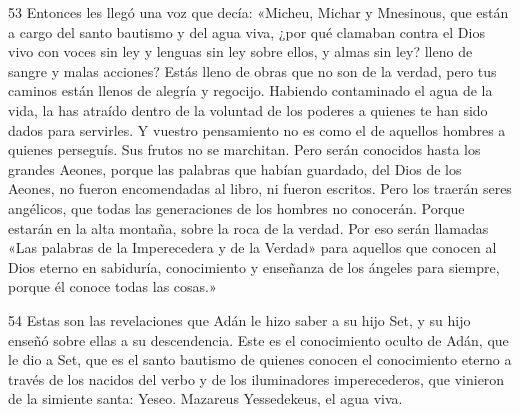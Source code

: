 \par 53 Entonces les llegó una voz que decía: «Micheu, Michar y Mnesinous, que están a cargo del santo bautismo y del agua viva, ¿por qué clamaban contra el Dios vivo con voces sin ley y lenguas sin ley sobre ellos, y almas sin ley? lleno de sangre y malas acciones? Estás lleno de obras que no son de la verdad, pero tus caminos están llenos de alegría y regocijo. Habiendo contaminado el agua de la vida, la has atraído dentro de la voluntad de los poderes a quienes te han sido dados para servirles. Y vuestro pensamiento no es como el de aquellos hombres a quienes perseguís. Sus frutos no se marchitan. Pero serán conocidos hasta los grandes Aeones, porque las palabras que habían guardado, del Dios de los Aeones, no fueron encomendadas al libro, ni fueron escritos. Pero los traerán seres angélicos, que todas las generaciones de los hombres no conocerán. Porque estarán en la alta montaña, sobre la roca de la verdad. Por eso serán llamadas «Las palabras de la Imperecedera y de la Verdad» para aquellos que conocen al Dios eterno en sabiduría, conocimiento y enseñanza de los ángeles para siempre, porque él conoce todas las cosas.»

\par 54 Estas son las revelaciones que Adán le hizo saber a su hijo Set, y su hijo enseñó sobre ellas a su descendencia. Este es el conocimiento oculto de Adán, que le dio a Set, que es el santo bautismo de quienes conocen el conocimiento eterno a través de los nacidos del verbo y de los iluminadores imperecederos, que vinieron de la simiente santa: Yeseo. Mazareus Yessedekeus, el agua viva.



